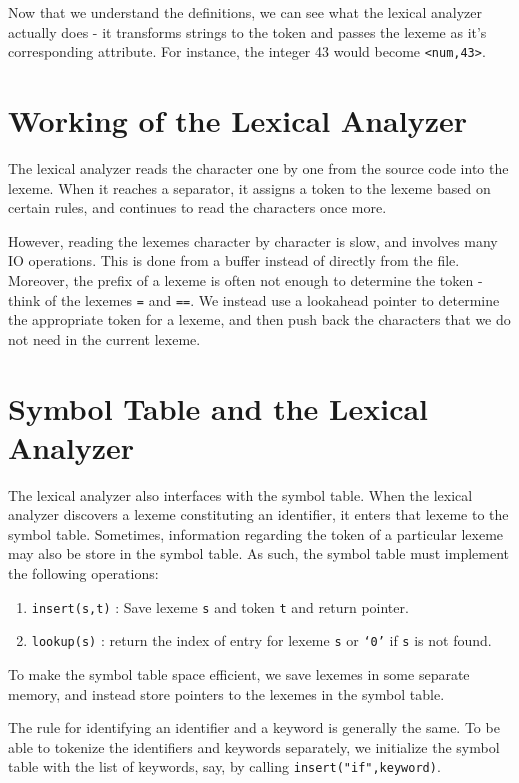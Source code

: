 \documentclass[12pt,letterpaper]{amsbook}
\theoremstyle{definition}
\begin{document}
Now that we understand the definitions, we can see what the lexical analyzer actually does - it transforms strings to the token and passes the lexeme as it's corresponding attribute. For instance, the integer 43 would become \texttt{<num,43>}.

\section{Working of the Lexical Analyzer}

The lexical analyzer reads the character one by one from the source code into the lexeme. When it reaches a separator, it assigns a token to the lexeme based on certain rules, and continues to read the characters once more.

However, reading the lexemes character by character is slow, and involves many IO operations. This is done from a buffer instead of directly from the file. Moreover, the prefix of a lexeme is often not enough to determine the token - think of the lexemes \texttt{=} and \texttt{==}. We instead use a lookahead pointer to determine the appropriate token for a lexeme, and then push back the characters that we do not need in the current lexeme.

\section{Symbol Table and the Lexical Analyzer}

The lexical analyzer also interfaces with the symbol table. When the lexical analyzer discovers a lexeme constituting an identifier, it enters that lexeme to the symbol table. Sometimes, information regarding the token of a particular lexeme may also be store in the symbol table. As such, the symbol table must implement the following operations:

\begin{enumerate}
  \item \texttt{insert(s,t)} : Save lexeme \texttt{s} and token \texttt{t} and return pointer.
  \item \texttt{lookup(s)} : return the index of entry for lexeme \texttt{s} or \texttt{`0'} if \texttt{s} is not found.
\end{enumerate}

To make the symbol table space efficient, we save lexemes in some separate memory, and instead store pointers to the lexemes in the symbol table.

The rule for identifying an identifier and a keyword is generally the same. To be able to tokenize the identifiers and keywords separately, we initialize the symbol table with the list of keywords, say, by calling \texttt{insert("if",keyword)}.
\end{document}
